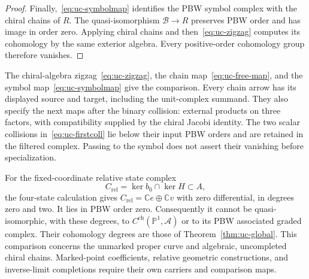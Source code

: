 \begin{proof}
Finally,~\eqref{eq:uc-symbolmap} identifies the PBW symbol complex with the chiral chains of $R$.
The quasi-isomorphism $\mathcal B\to R$ preserves PBW order and has image in order zero.
Applying chiral chains and then~\eqref{eq:uc-zigzag} computes its cohomology by the same exterior algebra.
Every positive-order cohomology group therefore vanishes.
\end{proof}

The chiral-algebra zigzag~\eqref{eq:uc-zigzag}, the chain map~\eqref{eq:uc-free-map}, and the symbol map~\eqref{eq:uc-symbolmap} give the comparison.
Every chain arrow has its displayed source and target, including the unit-complex summand.
They also specify the next maps after the binary collision: external products on three factors, with compatibility supplied by the chiral Jacobi identity.
The two scalar collisions in~\eqref{eq:uc-firstcoll} lie below their input PBW orders and are retained in the filtered complex.
Passing to the symbol does not assert their vanishing before specialization.

For the fixed-coordinate relative state complex
\[
 C_{\mathrm{rel}}=\ker b_0\cap\ker H\subset A,
\]
the four-state calculation gives $C_{\mathrm{rel}}=\mathbb Ce\oplus\mathbb Cv$ with zero differential, in degrees zero and two.
It lies in PBW order zero.
Consequently it cannot be quasi-isomorphic, with these degrees, to $C^{\mathrm{ch}}(\mathbb P^1,\mathcal A)$ or to its PBW associated graded complex.
Their cohomology degrees are those of Theorem~\ref{thm:uc-global}.
This comparison concerns the unmarked proper curve and algebraic, uncompleted chiral chains.
Marked-point coefficients, relative geometric constructions, and inverse-limit completions require their own carriers and comparison maps.
